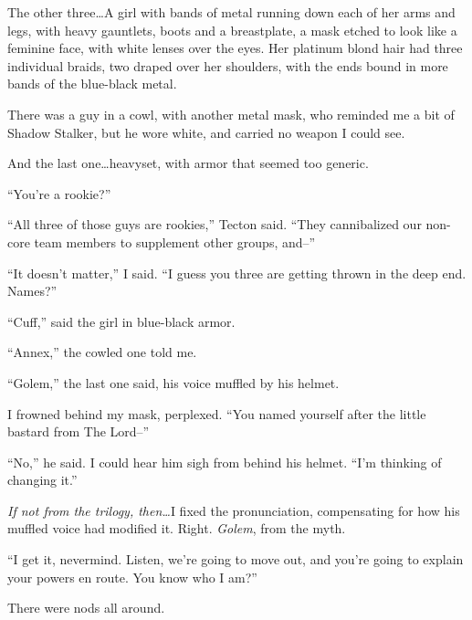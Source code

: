 The other three\ldots A girl with bands of metal running down each of her arms and legs, with heavy gauntlets, boots and a breastplate, a mask etched to look like a feminine face, with white lenses over the eyes.  Her platinum blond hair had three individual braids, two draped over her shoulders, with the ends bound in more bands of the blue-black metal.



There was a guy in a cowl, with another metal mask, who reminded me a bit of Shadow Stalker, but he wore white, and carried no weapon I could see.



And the last one\ldots heavyset, with armor that seemed too generic.



``You're a rookie?''



``All three of those guys are rookies,'' Tecton said.  ``They cannibalized our non-core team members to supplement other groups, and--''



``It doesn't matter,'' I said.  ``I guess you three are getting thrown in the deep end.  Names?''



``Cuff,'' said the girl in blue-black armor.



``Annex,'' the cowled one told me.



``Golem,'' the last one said, his voice muffled by his helmet.



I frowned behind my mask, perplexed.  ``You named yourself after the little bastard from The Lord--''



``No,'' he said.  I could hear him sigh from behind his helmet.  ``I'm thinking of changing it.''



\emph{If not from the trilogy, then\ldots  }I fixed the pronunciation, compensating for how his muffled voice had modified it.  Right.  \emph{Golem}, from the myth.



``I get it, nevermind.  Listen, we're going to move out, and you're going to explain your powers en route.  You know who I am?''



There were nods all around.



